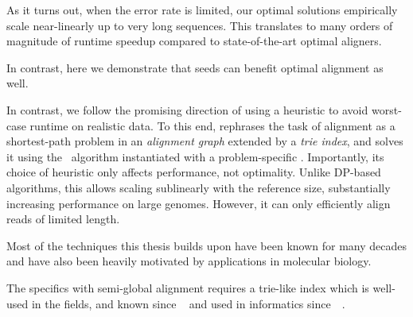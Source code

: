 As it turns out, when the error rate is limited, our optimal solutions
empirically scale near-linearly up to very long sequences. This translates to
many orders of magnitude of runtime speedup compared to state-of-the-art optimal
aligners.


In contrast, here we demonstrate that seeds can benefit optimal alignment as
well.

In contrast, we follow the promising direction of using a heuristic to avoid
worst-case runtime on realistic data. To this end, \astarix rephrases the task
of alignment as a shortest-path problem in an \emph{alignment graph} extended by
a \emph{trie index}, and solves it using the \A~algorithm instantiated with a
problem-specific \prefixh. Importantly, its choice of heuristic only affects
performance, not optimality.
%
Unlike DP-based algorithms, this \prefixh allows scaling sublinearly with the
reference size, substantially increasing performance on large genomes. However,
it can only efficiently align reads of limited length.

Most of the techniques this thesis builds upon have been known for many decades
and have also been heavily motivated by applications in molecular biology. 

The specifics with semi-global alignment requires a trie-like index which is
well-used in the fields, and known since
\citeyear{thue1912gegenseitige}~\cite{thue1912gegenseitige} and used in
informatics since~\citeyear{de1959file}~\cite{de1959file}.